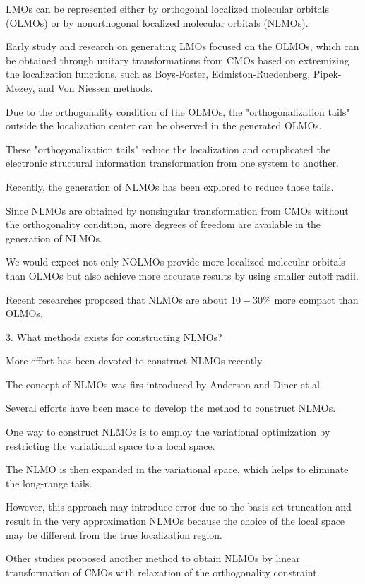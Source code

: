 \documentclass[aps,prl,reprint,amsmath,amssymb]{revtex4-1}
\begin{document}
LMOs can be represented either by orthogonal localized molecular orbitals (OLMOs) or by nonorthogonal localized molecular orbitals (NLMOs).

Early study and research on generating LMOs focused on the OLMOs, which can be obtained through unitary transformations from CMOs based on extremizing the localization functions, such as Boys-Foster, Edmiston-Ruedenberg, Pipek-Mezey, and Von Niessen methods.

Due to the orthogonality condition of the OLMOs, the "orthogonalization tails" outside the localization center can be observed in the generated OLMOs.

These "orthogonalization tails" reduce the localization and complicated the electronic structural information transformation from one system to another.

Recently, the generation of NLMOs has been explored to reduce those tails.

Since NLMOs are obtained by nonsingular transformation from CMOs without the orthogonality condition, more degrees of freedom are available in the generation of NLMOs. 

We would expect not only NOLMOs provide more localized molecular orbitals than OLMOs but also achieve more accurate results by using smaller cutoff radii.

Recent researches proposed that NLMOs are about $10-30 \%$ more compact than OLMOs.

3. What methods exists for constructing NLMOs? 

More effort has been devoted to construct NLMOs recently.

The concept of NLMOs was firs introduced by Anderson and Diner et al.

Several efforts have been made to develop the method to construct NLMOs.

One way to construct NLMOs is to employ the variational optimization by restricting the variational space to a local space.

The NLMO is then expanded in the variational space, which helps to eliminate the long-range tails.

However, this approach may introduce error due to the basis set truncation and result in the very approximation NLMOs because the choice of the local space may be different from the true localization region.

Other studies proposed another method to obtain NLMOs by linear transformation of CMOs with relaxation of the orthogonality constraint.
\end{document}

